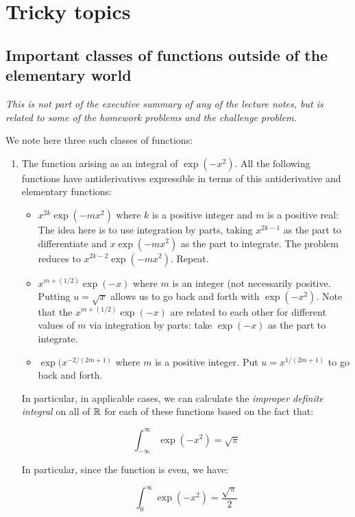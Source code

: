 \documentclass[10pt]{amsart}
\begin{document}
\section{Tricky topics}

\subsection{Important classes of functions outside of the elementary world}

{\em This is not part of the executive summary of any of the lecture
notes, but is related to some of the homework problems and the
challenge problem.}

We note here three such classes of functions:

\begin{enumerate}
\item The function arising as an integral of $\exp(-x^2)$. All the
  following functions have antiderivatives expressible in terms of
  this antiderivative and elementary functions: 

  \begin{itemize}
  \item $x^{2k}\exp(-mx^2)$ where $k$ is a positive integer and $m$ is
    a positive real: The idea here is to use integration by parts,
    taking $x^{2k - 1}$ as the part to differentiate and
    $x\exp(-mx^2)$ as the part to integrate. The problem reduces to
    $x^{2k - 2}\exp(-mx^2)$. Repeat.
  \item $x^{m + (1/2)}\exp(-x)$ where $m$ is an integer (not
    necessarily positive. Putting $u = \sqrt{x}$ allows us to go back
    and forth with $\exp(-x^2)$. Note that the $x^{m + (1/2)}\exp(-x)$
    are related to each other for different values of $m$ via
    integration by parts: take $\exp(-x)$ as the part to integrate.
  \item $\exp(x^{-2/(2m + 1)}$ where $m$ is a positive integer. Put $u
    = x^{1/(2m + 1)}$ to go back and forth.
  \end{itemize}

  In particular, in applicable cases, we can calculate the {\em
  improper definite integral} on all of $\mathbb{R}$ for each of these
  functions based on the fact that:

  $$\int_{-\infty}^\infty \exp(-x^2) = \sqrt{\pi}$$

  In particular, since the function is even, we have:

  $$\int_0^\infty \exp(-x^2) = \frac{\sqrt{\pi}}{2}$$


\end{enumerate}
\end{document}
